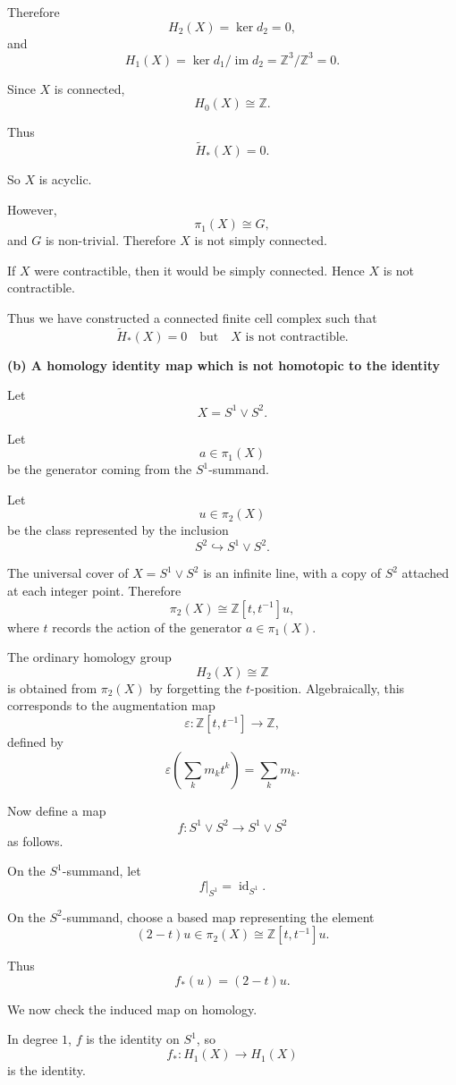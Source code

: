 \begin{solution}
Therefore
\[
H_2(X)=\ker d_2=0,
\]
and
\[
H_1(X)=\ker d_1/\operatorname{im}d_2
=
\mathbb Z^3/\mathbb Z^3
=
0.
\]

Since \(X\) is connected,
\[
H_0(X)\cong \mathbb Z.
\]

Thus
\[
\widetilde H_*(X)=0.
\]

So \(X\) is acyclic.

However,
\[
\pi_1(X)\cong G,
\]
and \(G\) is non-trivial. Therefore \(X\) is not simply connected.

If \(X\) were contractible, then it would be simply connected. Hence \(X\) is not contractible.

Thus we have constructed a connected finite cell complex such that
\[
\boxed{
	\widetilde H_*(X)=0
	\quad
	\text{but}
	\quad
	X\text{ is not contractible.}
}
\]


\medskip
\noindent\textbf{(b) A homology identity map which is not homotopic to the identity}\par
\smallskip


Let
\[
X=S^1\vee S^2.
\]

Let
\[
a\in \pi_1(X)
\]
be the generator coming from the \(S^1\)-summand.

Let
\[
u\in \pi_2(X)
\]
be the class represented by the inclusion
\[
S^2\hookrightarrow S^1\vee S^2.
\]

The universal cover of \(X=S^1\vee S^2\) is an infinite line, with a copy of \(S^2\) attached at each integer point. Therefore
\[
\pi_2(X)\cong \mathbb Z[t,t^{-1}]u,
\]
where \(t\) records the action of the generator \(a\in \pi_1(X)\).

The ordinary homology group
\[
H_2(X)\cong \mathbb Z
\]
is obtained from \(\pi_2(X)\) by forgetting the \(t\)-position. Algebraically, this corresponds to the augmentation map
\[
\varepsilon:\mathbb Z[t,t^{-1}]\to \mathbb Z,
\]
defined by
\[
\varepsilon\left(\sum_k m_k t^k\right)
=
\sum_k m_k.
\]

Now define a map
\[
f:S^1\vee S^2\to S^1\vee S^2
\]
as follows.

On the \(S^1\)-summand, let
\[
f|_{S^1}=\operatorname{id}_{S^1}.
\]

On the \(S^2\)-summand, choose a based map representing the element
\[
(2-t)u\in \pi_2(X)\cong \mathbb Z[t,t^{-1}]u.
\]

Thus
\[
f_*(u)=(2-t)u.
\]

We now check the induced map on homology.

In degree \(1\), \(f\) is the identity on \(S^1\), so
\[
f_*:H_1(X)\to H_1(X)
\]
is the identity.


\end{solution}
